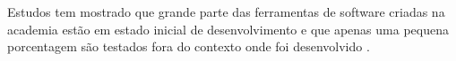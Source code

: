 Estudos tem mostrado que grande parte das ferramentas de software criadas na
academia estão em estado inicial de desenvolvimento \cite{marshall2013tools} e
que apenas uma pequena porcentagem são testados fora do contexto onde foi
desenvolvido \cite{Portillo12}.





%



